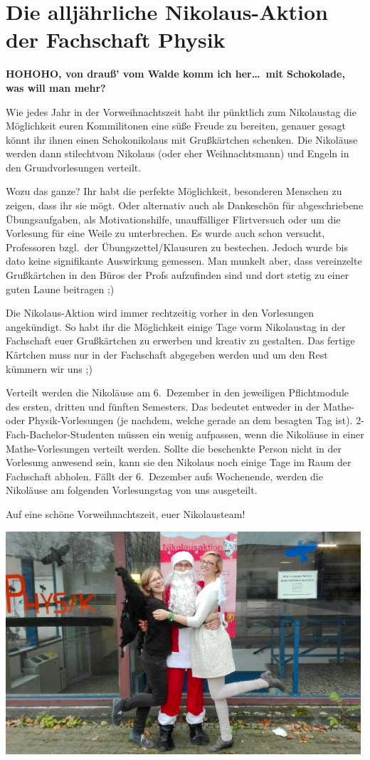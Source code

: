 \section{Die alljährliche Nikolaus-Aktion der Fachschaft Physik}
\begin{multicols}{2}
\textbf{HOHOHO, von drauß' vom Walde komm ich her\dots\
	mit Schokolade, was will man mehr?}

Wie jedes Jahr in der Vorweihnachtszeit habt ihr pünktlich zum Nikolaustag die Möglichkeit euren Kommilitonen eine süße Freude zu bereiten, genauer gesagt könnt ihr ihnen einen Schokonikolaus mit Grußkärtchen schenken. 
Die Nikoläuse werden dann \leftqq stilecht\rightqq  vom Nikolaus (oder eher Weihnachtsmann) und Engeln in den Grundvorlesungen verteilt.

Wozu das ganze? Ihr habt die perfekte Möglichkeit, besonderen Menschen zu zeigen, dass ihr sie mögt. Oder alternativ auch als Dankeschön für abgeschriebene Übungsaufgaben, als Motivationshilfe, 
unauffälliger Flirtversuch oder um die Vorlesung für eine Weile zu unterbrechen. Es wurde auch schon versucht, Professoren bzgl.\ der Übungszettel/Klausuren zu bestechen. 
Jedoch wurde bis dato keine signifikante Auswirkung gemessen. Man munkelt aber, dass vereinzelte Grußkärtchen in den Büros der Profs aufzufinden sind und dort stetig zu einer guten Laune beitragen ;)

Die Nikolaus-Aktion wird immer rechtzeitig vorher in den Vorlesungen angekündigt. So habt ihr die Möglichkeit einige Tage vorm Nikolaustag in der Fachschaft euer Grußkärtchen zu erwerben und kreativ zu gestalten. 
Das fertige Kärtchen muss nur in der Fachschaft abgegeben werden und um den Rest kümmern wir uns ;)

Verteilt werden die Nikoläuse am 6.~Dezember in den jeweiligen Pflichtmodule des ersten, dritten und fünften Semesters. Das bedeutet entweder in der Mathe- oder Physik-Vorlesungen (je nachdem, welche gerade an dem besagten Tag ist).
2-Fach-Bachelor-Studenten müssen ein wenig aufpassen, wenn die Nikoläuse in einer Mathe-Vorlesungen verteilt werden.
Sollte die beschenkte Person nicht in der Vorlesung anwesend sein, kann sie den Nikolaus noch einige Tage im Raum der Fachschaft abholen.
Fällt der 6.~Dezember aufs Wochenende, werden die Nikoläuse am folgenden Vorlesungstag von uns ausgeteilt.

Auf eine schöne Vorweihnachtszeit, euer Nikolausteam!

\end{multicols}

\vspace{\fill}
\begin{center}
	\includegraphics[width=0.99\textwidth]{res/nikolaus.jpg}
\end{center}
